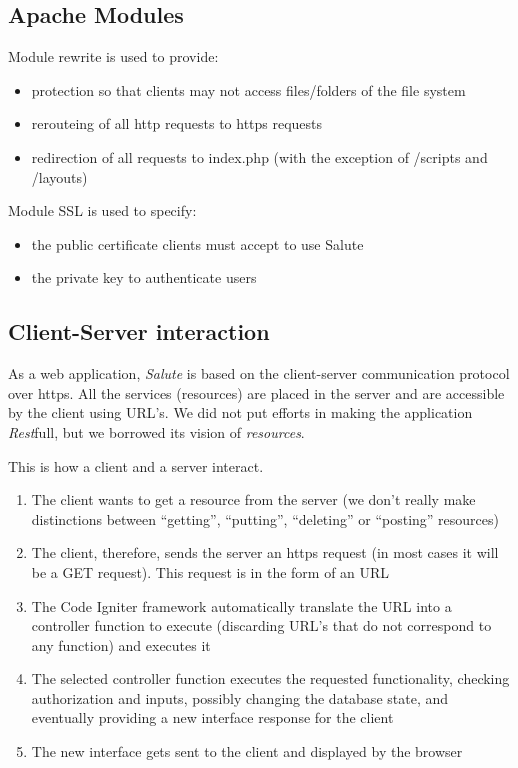 \subsection{Apache Modules}
Module rewrite is used to provide:
\begin{itemize}
\item protection so that clients may not access files/folders of the file system
\item rerouteing of all http requests to https requests
\item redirection of all requests to index.php (with the exception of /scripts and /layouts)
\end{itemize}
Module SSL is used to specify:
\begin{itemize}
\item the public certificate clients must accept to use Salute
\item the private key to authenticate users
\end{itemize}

\subsection{Client-Server interaction}
As a web application, \emph{Salute} is based on the client-server communication protocol over https. All the services (resources) are placed in the server and are accessible by the client using URL's. We did not put efforts in making the application \emph{Rest}full, but we borrowed its vision of \emph{resources}.

This is how a client and a server interact.
\begin{enumerate}
\item The client wants to get a resource from the server (we don't really make distinctions between ``getting'', ``putting'', ``deleting'' or ``posting'' resources)
\item The client, therefore, sends the server an https request (in most cases it will be a GET request). This request is in the form of an URL
\item The Code Igniter framework automatically translate the URL into a controller function to execute (discarding URL's that do not correspond to any function) and executes it
\item The selected controller function executes the requested functionality, checking authorization and inputs, possibly changing the database state, and eventually providing a new interface response for the client
\item The new interface gets sent to the client and displayed by the browser
\end{enumerate}

